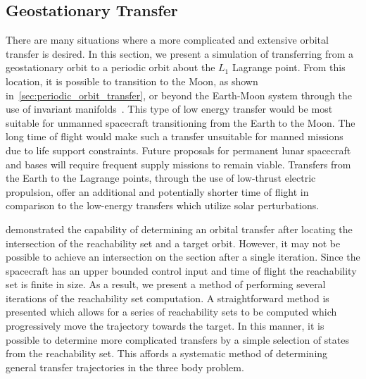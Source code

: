 \documentclass[smallcondensed]{svjour3}
\begin{document}
\subsection{Geostationary Transfer}\label{sec:geo_transfer}

There are many situations where a more complicated and extensive orbital transfer is desired. 
In this section, we present a simulation of transferring from a geostationary orbit to a periodic orbit about the \( L_1 \) Lagrange point.
From this location, it is possible to transition to the Moon, as shown in~\cref{sec:periodic_orbit_transfer}, or beyond the Earth-Moon system through the use of invariant manifolds~\cite{koon2011}.
This type of low energy transfer would be most suitable for unmanned spacecraft transitioning from the Earth to the Moon.
The long time of flight would make such a transfer unsuitable for manned missions due to life support constraints.
Future proposals for permanent lunar spacecraft and bases will require frequent supply missions to remain viable. 
Transfers from the Earth to the Lagrange points, through the use of low-thrust electric propulsion, offer an additional and potentially shorter time of flight in comparison to the low-energy transfers which utilize solar perturbations.

 demonstrated the capability of determining an orbital transfer after locating the intersection of the reachability set and a target orbit.
However, it may not be possible to achieve an intersection on the \Poincare section after a single iteration. 
Since the spacecraft has an upper bounded control input and time of flight the reachability set is finite in size. 
As a result, we present a method of performing several iterations of the reachability set computation. 
A straightforward method is presented which allows for a series of reachability sets to be computed which progressively move the trajectory towards the target.
In this manner, it is possible to determine more complicated transfers by a simple selection of states from the reachability set.
This affords a systematic method of determining general transfer trajectories in the three body problem.
\end{document}
